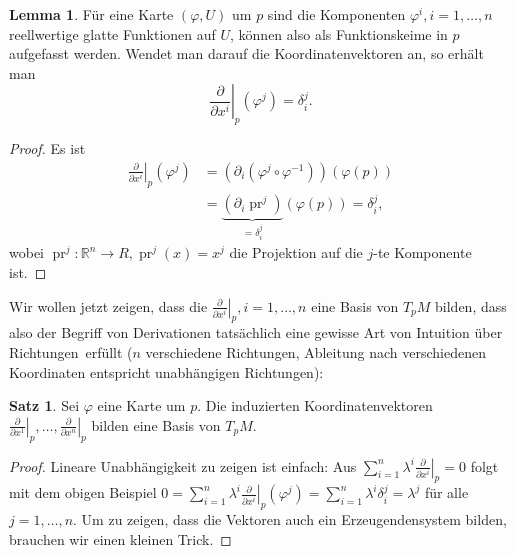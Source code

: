 \documentclass[a4paper]{scrreprt}
\numberwithin{equation}{chapter}
\DeclareMathOperator{\pr}{pr}
\theoremstyle{definition}
\newtheorem{lemma}[defn]{Lemma}
\newtheorem{satz}[defn]{Satz}
\begin{document}
\begin{lemma}
	Für eine Karte $(\varphi,U)$ um $p$ sind die Komponenten $\varphi^i, i = 1,\dots, n$ reellwertige glatte Funktionen auf $U$, können also als Funktionskeime in $p$ aufgefasst werden. Wendet man darauf die Koordinatenvektoren an, so erhält man \[\left.\frac{\partial}{\partial x^i}\right|_p (\varphi^j) = \delta^j_i.\]
	\begin{proof}
		Es ist
		\begin{align*}
			\left.\frac{\partial}{\partial x^i}\right|_p (\varphi^j) &= \left(\partial_i \left(\varphi^j\circ \varphi^{-1}\right)\right) (\varphi(p))\\
			&= \underbrace{\left(\partial_i \pr^j\right)}_{= \delta^j_i} (\varphi(p)) = \delta^j_i,
		\end{align*}
		wobei $\pr^j\colon \mathbb R^n \to R, \pr^j(x) = x^j$ die Projektion auf die $j$-te Komponente ist.
	\end{proof}
\end{lemma}

Wir wollen jetzt zeigen, dass die $\left.\frac{\partial}{\partial x^i}\right|_p, i = 1,\dots,n$ eine Basis von $T_pM$ bilden, dass also der Begriff von Derivationen tatsächlich eine gewisse Art von Intuition über \glqq Richtungen\grqq\ erfüllt ($n$ verschiedene Richtungen, Ableitung nach verschiedenen Koordinaten entspricht unabhängigen Richtungen):
\begin{satz} \label{satz:koord_basis}
	Sei $\varphi$ eine Karte um $p$. Die induzierten Koordinatenvektoren $\left.\frac{\partial}{\partial x^1}\right|_p, \dots, \left.\frac{\partial}{\partial x^n}\right|_p$ bilden eine Basis von $T_pM$.

	\begin{proof}\let\qed\relax
		Lineare Unabhängigkeit zu zeigen ist einfach: Aus $\sum_{i=1}^n \lambda^i \left.\frac{\partial}{\partial x^i}\right|_p = 0$ folgt mit dem obigen Beispiel $0 = \sum_{i=1}^n \lambda^i \left.\frac{\partial}{\partial x^i}\right|_p (\varphi^j) = \sum_{i=1}^n \lambda^i \delta^j_i = \lambda^j$ für alle $j = 1,\dots, n$. Um zu zeigen, dass die Vektoren auch ein Erzeugendensystem bilden, brauchen wir einen kleinen Trick.
	\end{proof}
\end{satz}
\end{document}
